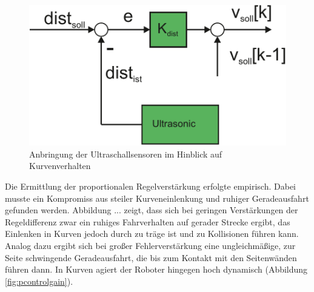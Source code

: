 \documentclass[12pt,a4paper,oneside]{article}
\begin{document}
\begin{spacing}{1.15}
\begin{figure}[!htb]
	\centering
	\includegraphics[scale=.5]{figs/Pcontrol}
	\caption{Anbringung der Ultraschallsensoren im Hinblick auf Kurvenverhalten}
	\label{fig:pcontrol}
\end{figure}

Die Ermittlung der proportionalen Regelverstärkung erfolgte empirisch. Dabei musste ein Kompromiss aus steiler Kurveneinlenkung und ruhiger Geradeausfahrt gefunden werden. Abbildung ... zeigt, dass sich bei geringen Verstärkungen der Regeldifferenz zwar ein ruhiges Fahrverhalten auf gerader Strecke ergibt, das Einlenken in Kurven jedoch durch zu träge ist und zu Kollisionen führen kann. Analog dazu ergibt sich bei großer Fehlerverstärkung eine ungleichmäßige, zur Seite schwingende Geradeausfahrt, die bis zum Kontakt mit den Seitenwänden führen dann. In Kurven agiert der Roboter hingegen hoch dynamisch (Abbildung \ref{fig:pcontrolgain}). 


\end{spacing}
\end{document}
